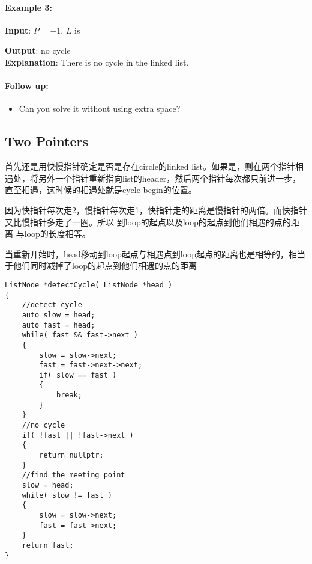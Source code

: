 \paragraph{Example 3:}
\begin{flushleft}
\textbf{Input}: $P=-1$, $L$ is
\begin{figure}[H]
\end{figure}
\textbf{Output}: no cycle
\\
\textbf{Explanation}: There is no cycle in the linked list.
\end{flushleft}
\paragraph{Follow up:}
\begin{itemize}
\item Can you solve it without using extra space?
\end{itemize}
\subsection{Two Pointers}
首先还是用快慢指针确定是否是存在circle的linked list。如果是，则在两个指针相遇处，将另外一个指针重新指向list的header，然后两个指针每次都只前进一步，直至相遇，这时候的相遇处就是cycle begin的位置。

因为快指针每次走2，慢指针每次走1，快指针走的距离是慢指针的两倍。而快指针又比慢指针多走了一圈。所以  到loop的起点以及loop的起点到他们相遇的点的距离 与loop的长度相等。

当重新开始时，head移动到loop起点与相遇点到loop起点的距离也是相等的，相当于他们同时减掉了loop的起点到他们相遇的点的距离

\setcounter{lstlisting}{0}
\begin{lstlisting}[style=customc, caption={Two Pointers}]
ListNode *detectCycle( ListNode *head )
{
    //detect cycle
    auto slow = head;
    auto fast = head;
    while( fast && fast->next )
    {
        slow = slow->next;
        fast = fast->next->next;
        if( slow == fast )
        {
            break;
        }
    }
    //no cycle
    if( !fast || !fast->next )
    {
        return nullptr;
    }
    //find the meeting point
    slow = head;
    while( slow != fast )
    {
        slow = slow->next;
        fast = fast->next;
    }
    return fast;
}
\end{lstlisting}